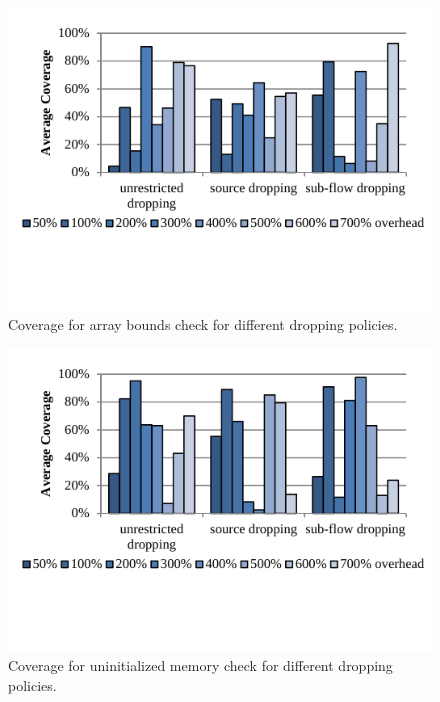 \begin{figure}
  \begin{center}
    \includegraphics[width=\columnwidth]{figs/data_bc_coverage.pdf}
    \vspace{-0.2in}
    \caption{Coverage for array bounds check for different dropping policies.}
    \label{fig:evaluation.bc_coverage}
    \vspace{-0.2in}
  \end{center}
\end{figure}

\begin{figure}
  \begin{center}
    \includegraphics[width=\columnwidth]{figs/data_umc_coverage.pdf}
    \vspace{-0.2in}
    \caption{Coverage for uninitialized memory check for different dropping policies.}
    \label{fig:evaluation.umc_coverage}
    \vspace{-0.1in}
  \end{center}
\end{figure}

